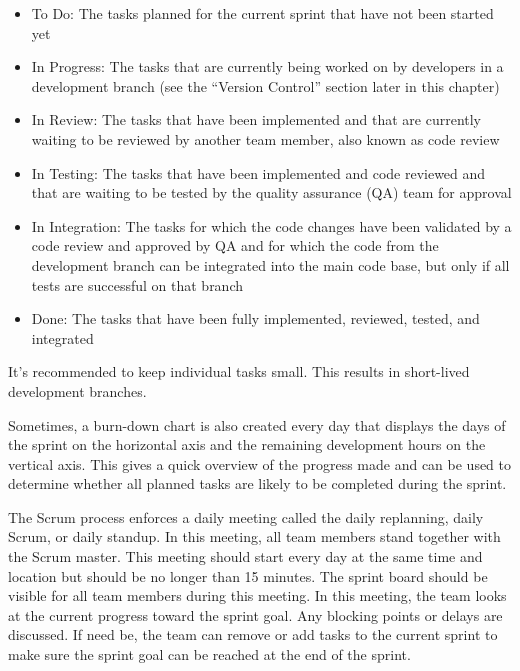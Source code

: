 \begin{itemize}
\item
To Do: The tasks planned for the current sprint that have not been started yet

\item
In Progress: The tasks that are currently being worked on by developers in a development branch (see the “Version Control” section later in this chapter)

\item
In Review: The tasks that have been implemented and that are currently waiting to be reviewed by another team member, also known as code review

\item
In Testing: The tasks that have been implemented and code reviewed and that are waiting to be tested by the quality assurance (QA) team for approval

\item
In Integration: The tasks for which the code changes have been validated by a code review and approved by QA and for which the code from the development branch can be integrated into the main code base, but only if all tests are successful on that branch

\item
Done: The tasks that have been fully implemented, reviewed, tested, and integrated
\end{itemize}

It’s recommended to keep individual tasks small. This results in short-lived development branches.

Sometimes, a burn-down chart is also created every day that displays the days of the sprint on the horizontal axis and the remaining development hours on the vertical axis. This gives a quick overview of the progress made and can be used to determine whether all planned tasks are likely to be completed during the sprint.

The Scrum process enforces a daily meeting called the daily replanning, daily Scrum, or daily standup. In this meeting, all team members stand together with the Scrum master. This meeting should start every day at the same time and location but should be no longer than 15 minutes. The sprint board should be visible for all team members during this meeting. In this meeting, the team looks at the current progress toward the sprint goal. Any blocking points or delays are discussed. If need be, the team can remove or add tasks to the current sprint to make sure the sprint goal can be reached at the end of the sprint.

